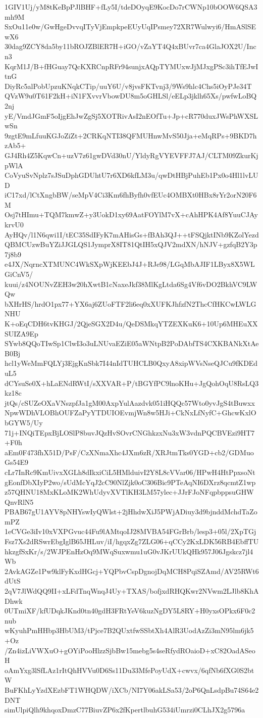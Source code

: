 1GIV1Uj/yM8tKeBpPJlBHF+fLy5I/tdeDOyqE9KocDo7rCWNp10bOOW6QSA3mh9M
SxOu11e0w/GwHgeDvvqITyVjEmpkpeEUyUqIPsmey72XR7Wulwyi6/HmASlSEwX6
30dag9ZCY8da5by11bROJZBlER7H+iGO/vZaYT4Q4xBUvr7ca4GlaJOX2U/Incn3
KqrM1J/B+fHGuay7QcKXRCnpRFr94sunjxAQpTYMUxwJjMJxgPSc3ihTfEJwItnG
DiyRc5alPobUpzuKNqkCTip/uuY6U/v8jvsFKTvnj3/9Ws9hlc4Chs5iOyPJe34T
QVzW9u0T61F2kH+iN1FXvvrVbowDU8m5oGHLSl/eELp3jklh65Xs/pwfwLoBQ2nj
yE/VmdJGmF5oIjgEhJwZgSj5XOTRivAsI2nEOfTu+Jp+cR770duxJWsPhWXSLwSn
9zgtE9mLfuuKGJoZiZt+2CRKqNTI38QFMUHnwMvS50Jja+eMqRPs+9BKD7hzAb5+
GJ4Rh4Z5KqwCn+uzV7z61gwDVd30nU/YldyRgVYEVFFJ7AJ/CLTM09ZkurKjpWlA
CoVyuSvNplz7sJSuDphGDUhtU7r6XD6kfLM3u/qwDtHBjPuhEb1Px0o4Hl1lvLUD
iC17xd/lCtXngbBW/seMpV4Ci3Km6fhByfh0vfEUc4OMBXt0HBx8rYr2orN20F6M
Osj7tHImu+TQM7kmwZ+y3UokD1xy69AatFOYlM7vX+cAhHPK4Af8YuuCJAykrvU0
AyHQv/l1N6qwi1I/tEC35SdIFyK7mAHisGs+fBAh3QJ++tFSQjktINb9KZolYezd
QBMCUzwBuYZiJJGLQS1JymprX8IT81QtIH5xQJV2mdXN/hNJV+gzfqB2Y3p7j8b9
e4JX/NqrncXTMUNC4WkSXpWjKEEbJ4J+RJe98/LGqMbAJIF1LByx8X5WLGiCnV5/
kuui/z4NOUNvZEH3w20hXwtB1cNaxeJkf38MlKgLtda6Sg4Vf6vDO2BkhVC9LWQw
bXHrHS/hrdO1px77+YX6aj6ZUoFTF2li6eq0xXUFKJhfzfN2ThcCfHKCwLWLGNHU
K+oEqCDH6tvKHGJ/2QjeSGX2D4u/QeDSMkqYTZEXKuK6+10Up6MHEuXXSUIZA9Ep
SYwb8QQoTIwSp1ClwI3o3uLNUvaEZiE05aWNtpB2PoDAbfTS4CXKBANkXtAeB0Bj
hcl1yWeMmFQLYj3EjgKnSbk7I44nIdTUHCLB0QxyA8xipWVsNseQJCu9fKDEduL5
dCYsuSe0X+hLaENdRWtI/sXXVAR+P/tBGYfPC9lnoKHu+JgQohOqU8RsLQ3kz18c
jtQs/cSUZeOXaVNszpfJa1gM00AxpYulAazdvk051iHQQc57Wto0yvJgS4tBuwxx
NpwWDhVLOBhOUFZaPyYTDUIOEvmjWn8w5HJi+CkNxLfNyfC+GhcwKxlObGYW5/Uy
71j+INQiTEpxBjLOSlP8buvJQzHvSOvrCNGhkzxNu3xW3vdnPQCBVEzi9HT7+F0h
aEm0F473fhX51D/PsF/CzXNmaXhc4JXm6zR/XRJtmTks0YGD+cb2/GDMuoGs54E9
cLr7InRc9KmUivxXGLh8dIkxiCiL5HMlduivI2Y8L8cVVar06/HPwH4HtPpxsoNt
gEonfDbXIyP2wo/sUdMcYqJ2cC90NlZjk0oC306Bic9PTeAqNI6DXrz8qcmtZ1wp
z57QHNU18MxKLoMK2WhUdyvXVTlKH3LM57ylec+JJrFJoNFqpbppsuGHWQnvRlN5
PBAB67gU1AYV8pNHYswIyQWlst+2jHhdwXiJ5PWjADiuy3d9bjnddMchdTaZomPZ
1eCVGe3iIv10xVXPGvuc44Fu9lAMtqoIJ28MVBA54FGrBrb/lesp3+05l/2XpTGj
Fsz7Xs2dRSwrEbgIglB65JHLuv/iI/hgqxZg7ZLG06+qCCy2KxLDK56RB4EbffTU
hkzgfSxKr/s/2WJPEnHzOq9MWqSuxwmu1uG0vJKrUUkQHk957J06Jgskcz7jl4Wb
2AvkAGZe1Pw9klFyKxdHGcj+YQPbvCspDgnojDqMCH8PqiSZAmd/AV25RWt6dUtS
2qV7JlWdQQ9II+xLFdTnqWnqJ4Uy+TXAS/bofjxdRHQKwr2NVwm2LJlb8KhADhwk
0UTmiXF/kfUDqkJKnd0tn40gdH3FRtYeV6kuzNgDY5L8RY+H0yxsOPkx6F0c2nub
wKyuhPmHHbp3HbUM3/tPjce7B2QUxtfwSSbtXh4AlR3UodAzZi3mN95lm6jk5+Oz
/Zn4izLiVWXuO+gOYiPooHlzzSjbBw15mebg5s4seRfydROaioD+xC82OadASeoH
oAmYxg3lSfLAz1rItQhHVVu0D6Ss11Du33MfePoyUdX+cwvx/6qfNb6fXG0S2btW
BuFKhLyYzdXEzbFT1WHQDW/iXCb/NI7Y06akLSa53/2oP6QnLsdpBu74S64e2DNT
simUlpiQlh9khqoxDmzC77BiuvZP6x2fKpertlbuhG534iUmrzi0CLhJX2g5796a
